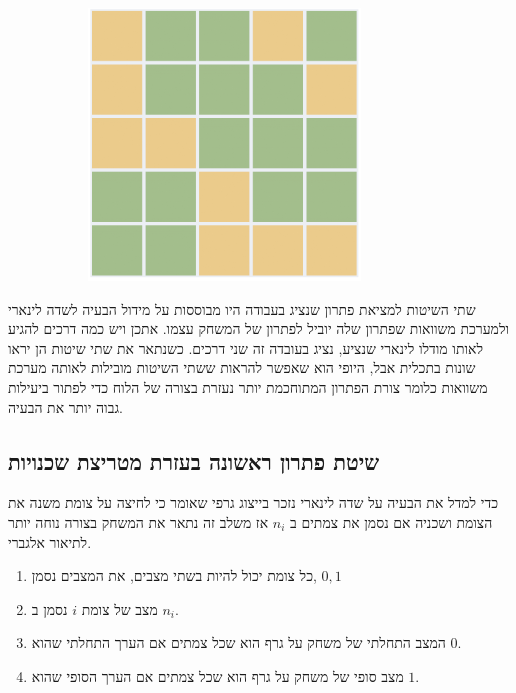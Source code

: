 \documentclass[12pt,leqno]{article}
\begin{document}
\begin{figure}[ht]
\begin{subfigure}[b]{.25\linewidth}
    \end{subfigure}
    \begin{subfigure}[b]{.25\linewidth}
    \includegraphics[width=0.95\linewidth]{images/5x5_sol.PNG}
    \end{subfigure}
\end{figure}

שתי השיטות למציאת פתרון שנציג בעבודה היו מבוססות
על מידול הבעיה לשדה לינארי ולמערכת משוואות שפתרון שלה יוביל לפתרון של המשחק עצמו.
אתכן ויש כמה דרכים להגיע לאותו מודלו לינארי שנציע, נציג בעובדה זה שני דרכים.
כשנתאר את שתי שיטות הן יראו שונות בתכלית אבל,
היופי הוא שאפשר להראות ששתי השיטות מובילות לאותה מערכת משוואות
כלומר צורת הפתרון המתוחכמת יותר נעזרת בצורה של הלוח כדי לפתור ביעילות גבוה יותר את הבעיה.

\subsection{שיטת פתרון ראשונה בעזרת מטריצת שכנויות}
כדי למדל את הבעיה על שדה לינארי נזכר בייצוג גרפי שאומר כי לחיצה על צומת משנה את הצומת ושכניה 
אם נסמן את צמתים ב
$n_i$
אז משלב זה נתאר את המשחק בצורה נוחה יותר לתיאור אלגברי.
\begin{enumerate}
    \item 
    כל צומת יכול להיות בשתי מצבים,
    את המצבים נסמן,
    ${0,1}$
    \item 
    מצב של צומת 
    $i$
    נסמן ב
    $n_i$.
    \item 
    המצב התחלתי של משחק על גרף הוא שכל צמתים אם הערך התחלתי
    שהוא 
    $0$.
    \item 
    מצב סופי של משחק
    על גרף הוא שכל צמתים 
    אם הערך הסופי
    שהוא
    $1$.
\end{enumerate}
\end{document}
